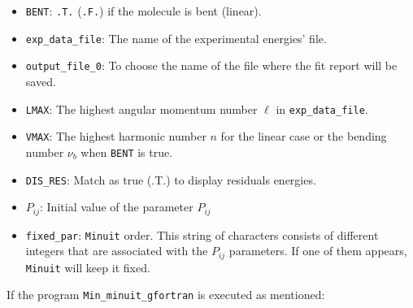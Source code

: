 \documentclass[a4paper,12pt,captions=tableheading]{article}
\begin{document}
\begin{itemize}
\item \verb~BENT~: \verb~.T.~ (\verb~.F.~) if the molecule is bent (linear).
\item \verb~exp_data_file~: The name of the experimental energies' file.
\item \verb~output_file_0~: To choose the name of the file where the fit report will be saved.
\item \verb~LMAX~: The highest angular momentum number \(\ell\) in \verb~exp_data_file~.
\item \verb~VMAX~: The highest harmonic number \(n\) for the linear case or the bending number \(\nu_b\) when \verb~BENT~ is true.
\item \verb~DIS_RES~: Match as true (.T.) to display residuals energies.
\item \(P_{ij}\): Initial value of the parameter \(P_{ij}\)
\item \verb~fixed_par~: \verb~Minuit~ order. This string of characters consists of different integers that are associated with the \(P_{ij}\) parameters. If one of them appears, \verb~Minuit~ will keep it fixed.
\end{itemize}

If the program \verb~Min_minuit_gfortran~ is executed as mentioned:
\end{document}
